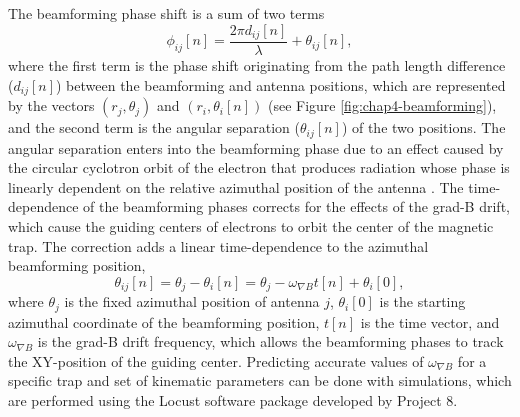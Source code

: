 The beamforming phase shift is a sum of two terms
\begin{equation}
    \phi_{ij}[n]=\frac{2\pi d_{ij}[n]}{\lambda}+\theta_{ij}[n],
\end{equation}
where the first term is the phase shift originating from the path length difference ($d_{ij}[n]$) between the beamforming and antenna positions, which are represented by the vectors $(r_j,\theta_j)$ and $(r_i,\theta_i[n])$ (see Figure \ref{fig:chap4-beamforming}), and the second term is the angular separation ($\theta_{ij}[n]$) of the two positions. The angular separation enters into the beamforming phase due to an effect caused by the circular cyclotron orbit of the electron that produces radiation whose phase is linearly dependent on the relative azimuthal position of the antenna \cite{nb_thesis, p8synca}. The time-dependence of the beamforming phases corrects for the effects of the grad-B drift, which cause the guiding centers of electrons to orbit the center of the magnetic trap. The correction adds a linear time-dependence to the azimuthal beamforming position,
\begin{equation}
    \theta_{ij}[n]=\theta_j-\theta_i[n] = \theta_j - \omega_{\nabla B}t[n]+\theta_{i}[0],
\end{equation}
where $\theta_j$ is the fixed azimuthal position of antenna $j$, $\theta_{i}[0]$ is the starting azimuthal coordinate of the beamforming position, $t[n]$ is the time vector, and $\omega_{\nabla B}$ is the grad-B drift frequency, which allows the beamforming phases to track the XY-position of the guiding center. Predicting accurate values of $\omega_{\nabla B}$ for a specific trap and set of kinematic parameters can be done with simulations, which are performed using the Locust software package \cite{p8locustpaper} developed by Project 8.

